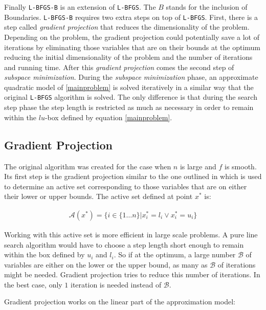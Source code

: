Finally \texttt{L-BFGS-B} is an extension of \texttt{L-BFGS}. The $B$ stands for the inclusion of Boundaries.  \texttt{L-BFGS-B} requires two extra steps on top of \texttt{L-BFGS}. First, there is a step called \emph{gradient projection} that reduces the dimensionality of the problem. Depending on the problem, the gradient projection could potentially save a lot of iterations by eliminating those variables that are on their bounds at the optimum reducing the initial dimensionality of the problem and the number of iterations and running time. After this \emph{gradient projection} comes the second step of \emph{subspace minimization}. During the \emph{subspace minimization} phase, an approximate quadratic model of \eqref{mainproblem} is solved iteratively in a similar way that the original \texttt{L-BFGS} algorithm is solved. The only difference is that during the search step phase the step length is restricted as much as necessary in order to remain within the $lu$-box defined by equation \eqref{mainproblem}.

\subsection{Gradient Projection} \label{gp}
The original algorithm was created for the case when $n$ is large and $f$ is smooth. Its first step is the gradient projection similar to the one outlined in \citep{gradproj1, gradproj2} which is used to determine an active set corresponding to those variables that are on either their lower or upper bounds. The active set defined at point $x^*$ is:

\begin{equation}
  \begin{aligned}
    \mathcal{A}(x^*) = \{ i \in \{1 \ldots n\} |  x^*_i = l_i \vee  x^*_i = u_i\}
  \end{aligned}
\end{equation}

Working with this active set is more efficient in large scale problems. A pure line search algorithm would have to choose a step length short enough to remain within the box defined by $u_i$ and $l_i$. So if at the optimum, a large number $\mathcal{B}$ of variables are either on the lower or the upper bound, as many as $\mathcal{B}$ of iterations might be needed. Gradient projection tries to reduce this number of iterations. In the best case, only $1$ iteration is needed instead of $\mathcal{B}$.

Gradient projection works on the linear part of the approximation model:

